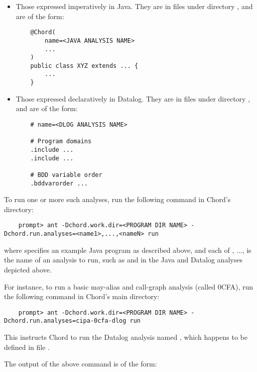 \begin{itemize}
\item
Those expressed imperatively in Java. They are in  files under
directory , and are of the form:

\begin{verbatim}
    @Chord(
        name=<JAVA ANALYSIS NAME>
        ...
    )
    public class XYZ extends ... {
        ...
    }
\end{verbatim}

\item

Those expressed declaratively in Datalog.  They are in  files under
directory , and are of the form:

\begin{verbatim}
    # name=<DLOG ANALYSIS NAME>

    # Program domains
    .include ...
    .include ...

    # BDD variable order
    .bddvarorder ...
\end{verbatim}
\end{itemize}

To run one or more such analyses, run the following command in Chord's  directory:

\begin{verbatim}
    prompt> ant -Dchord.work.dir=<PROGRAM DIR NAME> -Dchord.run.analyses=<name1>,...,<nameN> run
\end{verbatim}

where  specifies an example Java program as described above,
and each of , ...,  is the name of an analysis to run,
such as  and  in the Java and
Datalog analyses depicted above.

For instance, to run a basic may-alias and call-graph analysis (called 0CFA),
run the following command in Chord's main directory:

\begin{verbatim}
    prompt> ant -Dchord.work.dir=<PROGRAM DIR NAME> -Dchord.run.analyses=cipa-0cfa-dlog run
\end{verbatim}

This instructs Chord to run the Datalog analysis named ,
which happens to be defined in file .

The output of the above command is of the form:

